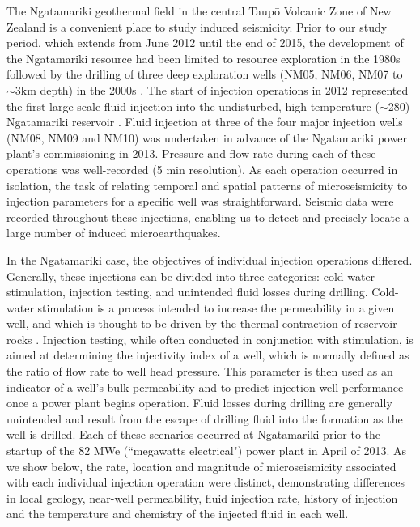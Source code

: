 The Ngatamariki geothermal field in the central Taup\={o} Volcanic Zone of New Zealand is a convenient place to study induced seismicity. Prior to our study period, which extends from June 2012 until the end of 2015, the development of the Ngatamariki resource had been limited to resource exploration in the 1980s followed by the drilling of three deep exploration wells (NM05, NM06, NM07 to $\sim$3km depth) in the 2000s \citep{Chambefort_2016}. The start of injection operations in 2012 represented the first large-scale fluid injection into the undisturbed, high-temperature ($\sim$280\textdegree) Ngatamariki reservoir \citep{Bignall_2009}. Fluid injection at three of the four major injection wells (NM08, NM09 and NM10) was undertaken in advance of the Ngatamariki power plant's commissioning in 2013. Pressure and flow rate during each of these operations was well-recorded (5 min resolution). As each operation occurred in isolation, the task of relating temporal and spatial patterns of microseismicity to injection parameters for a specific well was straightforward. Seismic data were recorded throughout these injections, enabling us to detect and precisely locate a large number of induced microearthquakes.

In the Ngatamariki case, the objectives of individual injection operations differed. Generally, these injections can be divided into three categories: cold-water stimulation, injection testing, and unintended fluid losses during drilling. Cold-water stimulation is a process intended to increase the permeability in a given well, and which is thought to be driven by the thermal contraction of reservoir rocks \citep{grant2013thermal}. Injection testing, while often conducted in conjunction with stimulation, is aimed at determining the injectivity index of a well, which is normally defined as the ratio of flow rate to well head pressure. This parameter is then used as an indicator of a well's bulk permeability and to predict injection well performance once a power plant begins operation. Fluid losses during drilling are generally unintended and result from the escape of drilling fluid into the formation as the well is drilled. Each of these scenarios occurred at Ngatamariki prior to the startup of the 82 MWe (``megawatts electrical") power plant in April of 2013. As we show below, the rate, location and magnitude of microseismicity associated with each individual injection operation were distinct, demonstrating differences in local geology, near-well permeability, fluid injection rate, history of injection and the temperature and chemistry of the injected fluid in each well.

